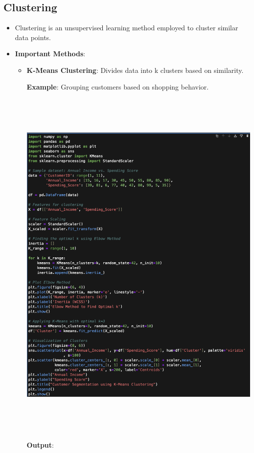 \documentclass{article}
\begin{document}
\subsection{Clustering}
 \begin{itemize}
    \item Clustering is an unsupervised learning method employed to cluster similar data points.
    \item \textbf{Important Methods}:
    \begin{itemize}
    \item \textbf{K-Means Clustering}: Divides data into k clusters based on similarity.

    \textbf{Example}: Grouping customers based on shopping behavior.

    \includegraphics[width=14cm,height=18cm]{K-Means.png}

\newpage
\textbf{Output}:


\end{itemize}
\end{itemize}
\end{document}
